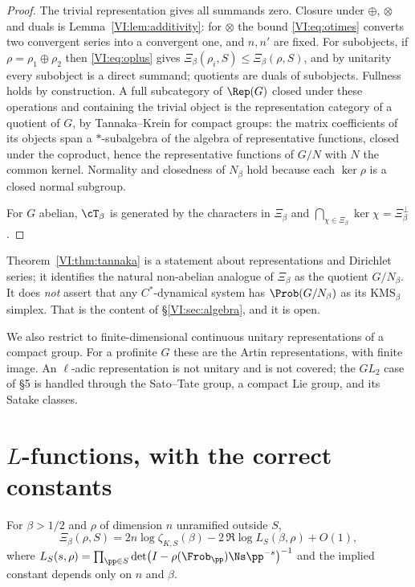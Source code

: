 \begin{proof}
The trivial representation gives all summands zero. Closure under $\oplus$, $\otimes$ and
duals is Lemma~\ref{VI:lem:additivity}: for $\otimes$ the bound \eqref{VI:eq:otimes} converts two
convergent series into a convergent one, and $n,n'$ are fixed. For subobjects, if
$\rho=\rho_1\oplus\rho_2$ then \eqref{VI:eq:oplus} gives
$\Xi_\beta(\rho_i,S)\le\Xi_\beta(\rho,S)$, and by unitarity every subobject is a direct
summand; quotients are duals of subobjects. Fullness holds by construction. A full
subcategory of $\Rep(G)$ closed under these operations and containing the trivial object is
the representation category of a quotient of $G$, by Tannaka--Krein for compact groups: the
matrix coefficients of its objects span a $*$-subalgebra of the algebra of representative
functions, closed under the coproduct, hence the representative functions of $G/N$ with $N$
the common kernel. Normality and closedness of $N_\beta$ hold because each $\ker\rho$ is a
closed normal subgroup.

For $G$ abelian, $\cT_\beta$ is generated by the characters in $\Xi_\beta$ and
$\bigcap_{\chi\in\Xi_\beta}\ker\chi=\Xi_\beta^\perp$.
\end{proof}

\begin{remark}\label{VI:rem:tannakawarn}
Theorem~\ref{VI:thm:tannaka} is a statement about representations and Dirichlet series; it
identifies the natural non-abelian analogue of $\Xi_\beta$ as the quotient $G/N_\beta$. It
does \emph{not} assert that any $C^*$-dynamical system has $\Prob(G/N_\beta)$ as its
$\mathrm{KMS}_\beta$ simplex. That is the content of \S\ref{VI:sec:algebra}, and it is open.

We also restrict to finite-dimensional continuous unitary representations of a compact
group. For a profinite $G$ these are the Artin representations, with finite image. An
$\ell$-adic representation is not unitary and is not covered; the $GL_2$ case of \S5 is
handled through the Sato--Tate group, a compact Lie group, and its Satake classes.
\end{remark}

\section{$L$-functions, with the correct constants}\label{VI:sec:L}

\begin{theorem}\label{VI:thm:euler}
For $\beta>1/2$ and $\rho$ of dimension $n$ unramified outside $S$,
\begin{equation}\label{VI:eq:euler}
\Xi_\beta(\rho,S)=2n\log\zeta_{K,S}(\beta)-2\,\Re\log L_S(\beta,\rho)+O(1),
\end{equation}
where $L_S(s,\rho)=\prod_{\pp\in S}\det\bigl(I-\rho(\Frob_\pp)\Ns\pp^{-s}\bigr)^{-1}$ and the
implied constant depends only on $n$ and $\beta$.
\end{theorem}

